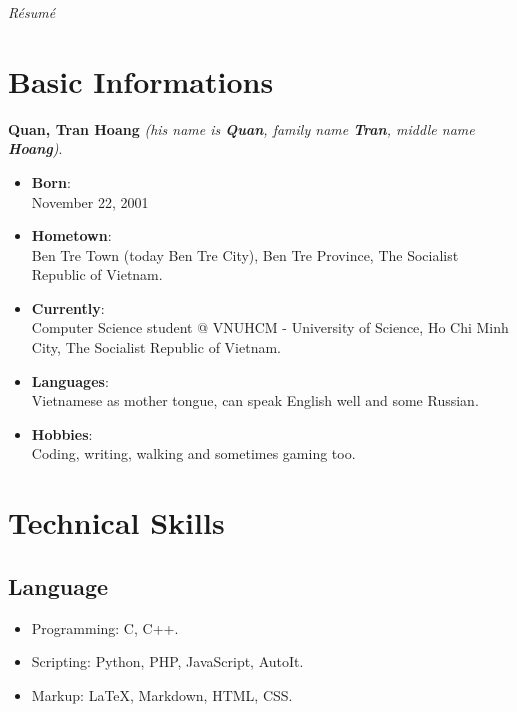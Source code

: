 \documentclass{article}
\renewcommand{\maketitle}{
    \begin{center}
        {\huge\bfseries\theauthor}
        \linebreak\linebreak
        \itshape{R\'esum\'e}
    \end{center}
}
\begin{document}
    \author{Quan, Tran Hoang}
    \maketitle

    \section{Basic Informations}
        {\bfseries Quan, Tran Hoang} {\itshape{(his name is {\bfseries{Quan}}, family name {\bfseries{Tran}}, middle name {\bfseries{Hoang}})}}.
        \begin{itemize}
            \item {\bfseries{Born}}: \\
                November 22, 2001
            \item {\bfseries{Hometown}}: \\
                Ben Tre Town (today Ben Tre City), Ben Tre Province, The Socialist Republic of Vietnam.
            \item {\bfseries{Currently}}: \\
                Computer Science student @ VNUHCM - University of Science, Ho Chi Minh City, The Socialist Republic of Vietnam.
            \item {\bfseries{Languages}}: \\
                Vietnamese as mother tongue, can speak English well and some Russian.
            \item {\bfseries{Hobbies}}: \\
                Coding, writing, walking and sometimes gaming too.
        \end{itemize}

    \section{Technical Skills}
        \subsection{Language}
            \begin{itemize}
                \item Programming: C, C++.
                \item Scripting: Python, PHP, JavaScript, AutoIt.
                \item Markup: \LaTeX, Markdown, HTML, CSS.
            \end{itemize}
\end{document}

